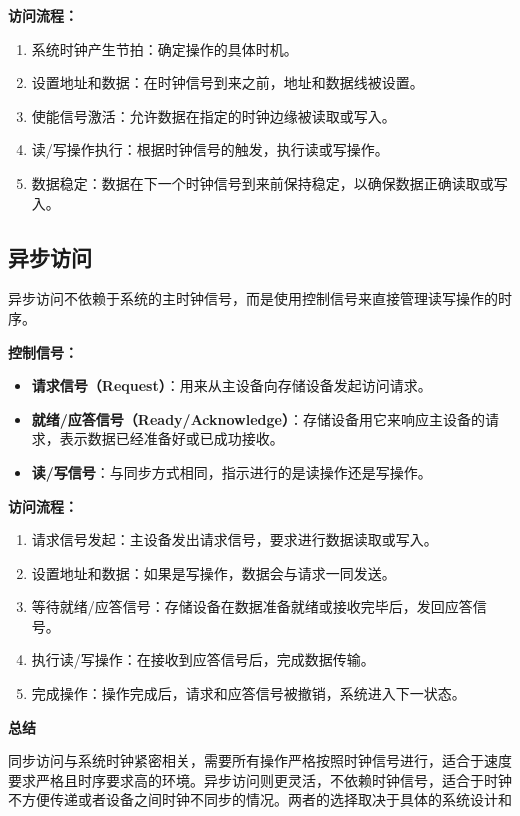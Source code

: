 \documentclass[AutoFakeBold]{LZUThesis}
\begin{document}
\textbf{访问流程：}
\begin{enumerate}
    \item 系统时钟产生节拍：确定操作的具体时机。
    \item 设置地址和数据：在时钟信号到来之前，地址和数据线被设置。
    \item 使能信号激活：允许数据在指定的时钟边缘被读取或写入。
    \item 读/写操作执行：根据时钟信号的触发，执行读或写操作。
    \item 数据稳定：数据在下一个时钟信号到来前保持稳定，以确保数据正确读取或写入。
\end{enumerate}

\subsection*{异步访问}

异步访问不依赖于系统的主时钟信号，而是使用控制信号来直接管理读写操作的时序。

\textbf{控制信号：}
\begin{itemize}
    \item \textbf{请求信号（Request）}：用来从主设备向存储设备发起访问请求。
    \item \textbf{就绪/应答信号（Ready/Acknowledge）}：存储设备用它来响应主设备的请求，表示数据已经准备好或已成功接收。
    \item \textbf{读/写信号}：与同步方式相同，指示进行的是读操作还是写操作。
\end{itemize}

\textbf{访问流程：}
\begin{enumerate}
    \item 请求信号发起：主设备发出请求信号，要求进行数据读取或写入。
    \item 设置地址和数据：如果是写操作，数据会与请求一同发送。
    \item 等待就绪/应答信号：存储设备在数据准备就绪或接收完毕后，发回应答信号。
    \item 执行读/写操作：在接收到应答信号后，完成数据传输。
    \item 完成操作：操作完成后，请求和应答信号被撤销，系统进入下一状态。
\end{enumerate}

\textbf{总结}

同步访问与系统时钟紧密相关，需要所有操作严格按照时钟信号进行，适合于速度要求严格且时序要求高的环境。异步访问则更灵活，不依赖时钟信号，适合于时钟不方便传递或者设备之间时钟不同步的情况。两者的选择取决于具体的系统设计和
\end{document}
